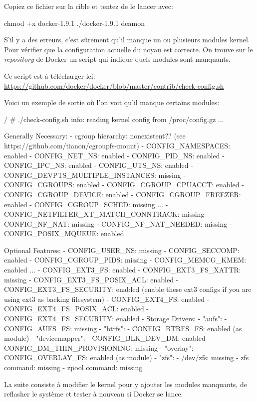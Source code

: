\documentclass[11pt,a4paper,oneside]{report}
\begin{document}
Copiez ce fichier sur la cible et tentez de le lancer avec:

\begin{bashcode}
chmod +x docker-1.9.1
./docker-1.9.1 deamon
\end{bashcode}

S'il y a des erreurs, c'est sûrement qu'il manque un ou plusieurs modules kernel. Pour vérifier que la configuration actuelle du noyau est correcte. On trouve sur le \textit{repository} de Docker un script qui indique quels modules sont manquants.

Ce script est à télécharger ici: \url{https://github.com/docker/docker/blob/master/contrib/check-config.sh}

\newpage
Voici un exemple de sortie où l'on voit qu'il manque certains modules:

\begin{bashcode}
/ # ./check-config.sh
info: reading kernel config from /proc/config.gz ...

Generally Necessary:
- cgroup hierarchy: nonexistent??
    (see https://github.com/tianon/cgroupfs-mount)
- CONFIG_NAMESPACES: enabled
- CONFIG_NET_NS: enabled
- CONFIG_PID_NS: enabled
- CONFIG_IPC_NS: enabled
- CONFIG_UTS_NS: enabled
- CONFIG_DEVPTS_MULTIPLE_INSTANCES: missing
- CONFIG_CGROUPS: enabled
- CONFIG_CGROUP_CPUACCT: enabled
- CONFIG_CGROUP_DEVICE: enabled
- CONFIG_CGROUP_FREEZER: enabled
- CONFIG_CGROUP_SCHED: missing
...
- CONFIG_NETFILTER_XT_MATCH_CONNTRACK: missing
- CONFIG_NF_NAT: missing
- CONFIG_NF_NAT_NEEDED: missing
- CONFIG_POSIX_MQUEUE: enabled

Optional Features:
- CONFIG_USER_NS: missing
- CONFIG_SECCOMP: enabled
- CONFIG_CGROUP_PIDS: missing
- CONFIG_MEMCG_KMEM: enabled
...
- CONFIG_EXT3_FS: enabled
- CONFIG_EXT3_FS_XATTR: missing
- CONFIG_EXT3_FS_POSIX_ACL: enabled
- CONFIG_EXT3_FS_SECURITY: enabled
    (enable these ext3 configs if you are using ext3 as backing filesystem)
- CONFIG_EXT4_FS: enabled
- CONFIG_EXT4_FS_POSIX_ACL: enabled
- CONFIG_EXT4_FS_SECURITY: enabled
- Storage Drivers:
  - "aufs":
    - CONFIG_AUFS_FS: missing
  - "btrfs":
    - CONFIG_BTRFS_FS: enabled (as module)
  - "devicemapper":
    - CONFIG_BLK_DEV_DM: enabled
    - CONFIG_DM_THIN_PROVISIONING: missing
  - "overlay":
    - CONFIG_OVERLAY_FS: enabled (as module)
  - "zfs":
    - /dev/zfs: missing
    - zfs command: missing
    - zpool command: missing
\end{bashcode}

La suite consiste à modifier le kernel pour y ajouter les modules manquants, de reflasher le système et tester à nouveau si Docker se lance.
\end{document}
